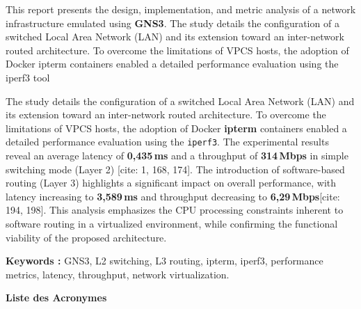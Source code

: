 \documentclass[11pt,a4paper,oneside]{report}
\begin{document}
\begin{tcolorbox}[keyresult, title={Executive Summary}]
{\small
This report presents the design, implementation, and metric analysis of a network infrastructure emulated using \textbf{GNS3}.
The study details the configuration of a switched Local Area Network (LAN) and its extension toward an inter-network routed architecture. To overcome the limitations of VPCS hosts, the adoption of Docker ipterm containers enabled a detailed performance evaluation using the iperf3 tool

The study details the configuration of a switched Local Area Network (LAN) and its extension toward an inter-network routed architecture. To overcome the limitations of VPCS hosts, the adoption of Docker \textbf{ipterm} containers enabled a detailed performance evaluation using the \texttt{iperf3}.
The experimental results reveal an average latency of \textbf{0,435\,ms} and a throughput of \textbf{314\,Mbps} in simple switching mode (Layer 2) [cite: 1, 168, 174]. The introduction of software-based routing (Layer 3) highlights a significant impact on overall performance, with latency increasing to \textbf{3,589\,ms} and throughput decreasing to \textbf{6,29\,Mbps}[cite: 194, 198]. This analysis emphasizes the CPU processing constraints inherent to software routing in a virtualized environment, while confirming the functional viability of the proposed architecture.
}
\end{tcolorbox}

\vspace{3pt}
\noindent\textbf{Keywords :} GNS3, L2 switching, L3 routing, ipterm, iperf3, performance metrics, latency, throughput, network virtualization.













\clearpage
\setcounter{tocdepth}{2}   %
\tableofcontents

\listoffigures
\clearpage
\listoftables

\vspace{2cm}
{\Large\bfseries\color{univblue} Liste des Acronymes}   
\end{document}
